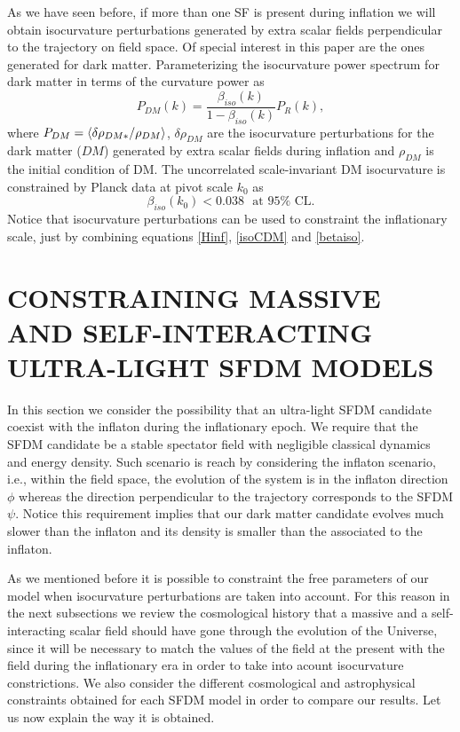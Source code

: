 \documentclass[amssymb,twocolumn,prd,nofootinbib,showpacs]{revtex4-1}
\begin{document}
As we have seen before, if more than one SF is present during inflation we will obtain isocurvature 
perturbations generated by extra scalar fields perpendicular to the trajectory on field space. Of special interest in this paper are the ones generated for dark matter.
%
Parameterizing the isocurvature power spectrum for dark matter in terms of the curvature power as
%
\begin{equation}\label{isoCDM}
P_{DM}(k) = \frac{\beta_{iso}(k)}{1-\beta_{iso}(k)}P_R(k),
\end{equation}
%
where $P_{DM}=\braket{\delta \rho_{DM*}/\rho_{DM}}$, $\delta\rho_{DM}$ are the isocurvature 
perturbations for the dark matter ($DM$) generated by extra scalar fields during inflation and $\rho_{DM}$ 
is the initial condition of DM. 
The uncorrelated scale-invariant DM isocurvature is constrained by Planck data \cite{const1,const2} 
at pivot scale $k_0$ as
%
\begin{equation}\label{betaiso}
\beta_{iso}(k_0)<0.038 \ \ \ \text{at $95\%$ CL}.
\end{equation}
%
Notice that isocurvature perturbations can be used to constraint the inflationary scale, 
just by combining equations \eqref{Hinf}, \eqref{isoCDM} and \eqref{betaiso}.
%
%
%
\section{CONSTRAINING MASSIVE AND
SELF-INTERACTING ULTRA-LIGHT SFDM
MODELS}\label{simplest}
In this section we consider the possibility that an ultra-light  SFDM  candidate  coexist  with  the  inflaton  during the inflationary epoch.  We require that the SFDM candidate be a stable spectator field with negligible classical dynamics and energy density. Such scenario is reach by considering the inflaton scenario, i.e., within the field space, the evolution of the system is in the inflaton direction $\phi$ whereas the direction perpendicular to the trajectory corresponds to the SFDM $\psi$. Notice  this requirement implies that our dark matter candidate evolves much slower than the inflaton and its density is smaller than the associated to the inflaton. 

As we mentioned before it is possible to constraint the free parameters of our model when isocurvature perturbations are taken into account.  For this reason in the next subsections we review the cosmological history that a massive and a self-interacting scalar field should have gone through the evolution  of  the  Universe,  since  it  will  be  necessary  to match the values of the field at the present with the field during the inflationary era in order to take into acount isocurvature constrictions. We also consider the different cosmological  and  astrophysical  constraints  obtained  for each SFDM model in order to compare our results.  Let us now explain the way it is obtained. 
\end{document}
